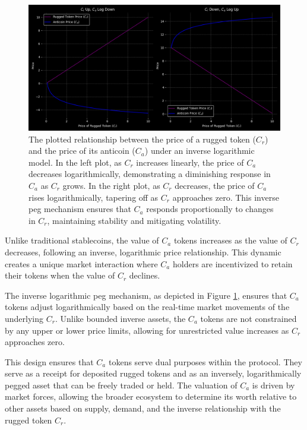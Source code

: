 \documentclass{article}
\begin{document}
\begin{figure}[h]
\centering
\includegraphics[width=\textwidth]{images/anticoins.png}
\caption{The plotted relationship between the price of a rugged token ($C_r$) and the price of its anticoin ($C_a$) under an inverse logarithmic model. In the left plot, as $C_r$ increases linearly, the price of $C_a$ decreases logarithmically, demonstrating a diminishing response in $C_a$ as $C_r$ grows. In the right plot, as $C_r$ decreases, the price of $C_a$ rises logarithmically, tapering off as $C_r$ approaches zero. This inverse peg mechanism ensures that $C_a$ responds proportionally to changes in $C_r$, maintaining stability and mitigating volatility.}
\label{fig:anticoins_plot}
\end{figure}

Unlike traditional stablecoins, the value of $C_a$ tokens increases as the value of $C_r$ decreases, following an inverse, logarithmic price relationship. This dynamic creates a unique market interaction where $C_a$ holders are incentivized to retain their tokens when the value of $C_r$ declines.

The inverse logarithmic peg mechanism, as depicted in Figure \ref{fig:anticoins_plot}, ensures that $C_a$ tokens adjust logarithmically based on the real-time market movements of the underlying $C_r$. Unlike bounded inverse assets, the $C_a$ tokens are not constrained by any upper or lower price limits, allowing for unrestricted value increases as $C_r$ approaches zero.

This design ensures that $C_a$ tokens serve dual purposes within the protocol. They serve as a receipt for deposited rugged tokens and as an inversely, logarithmically pegged asset that can be freely traded or held. The valuation of $C_a$ is driven by market forces, allowing the broader ecosystem to determine its worth relative to other assets based on supply, demand, and the inverse relationship with the rugged token $C_r$.
\end{document}
